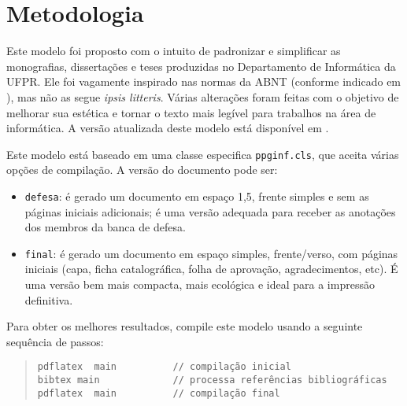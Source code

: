 \chapter{Metodologia}



Este modelo foi proposto com o intuito de padronizar e simplificar as monografias, dissertações e teses produzidas no Departamento de Informática da UFPR. Ele foi vagamente inspirado nas normas da ABNT (conforme indicado em \cite{bibufpr15}), mas não as segue \emph{ipsis litteris}. Várias alterações foram feitas com o objetivo de melhorar sua estética e tornar o texto mais legível para trabalhos na área de informática. A versão atualizada deste modelo está disponível em \cite{maziero15}.

Este modelo está baseado em uma classe especifica \verb#ppginf.cls#, que aceita várias opções de compilação. A versão do documento pode ser:

\begin{itemize}

\item \verb#defesa#: é gerado um documento em espaço 1,5, frente simples e sem as páginas iniciais adicionais; é uma versão adequada para receber as anotações dos membros da banca de defesa.

\item \verb#final#: é gerado um documento em espaço simples, frente/verso, com páginas iniciais (capa, ficha catalográfica, folha de aprovação, agradecimentos, etc). É uma versão bem mais compacta, mais ecológica e ideal para a impressão definitiva.

\end{itemize}

Para obter os melhores resultados, compile este modelo usando a seguinte sequência de passos:

\begin{quote}
\begin{footnotesize}
\begin{verbatim}
pdflatex  main          // compilação inicial
bibtex main             // processa referências bibliográficas
pdflatex  main          // compilação final
\end{verbatim}
\end{footnotesize}
\end{quote}

